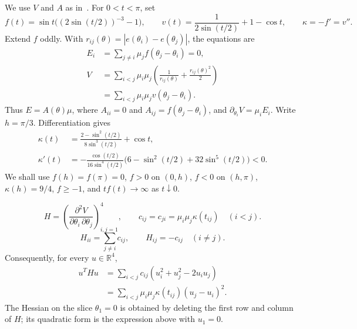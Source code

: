 \documentclass[11pt,a4paper]{article}
\numberwithin{equation}{section}
\theoremstyle{remark}
\newcommand{\R}{\mathbb R}
\begin{document}
We use $V$ and $A$ as in~\cite[Section~2]{CCLM}. For $0<t<\pi$, set
\begin{equation}\label{eq:kernel}
 f(t)=\sin t\bigl((2\sin(t/2))^{-3}-1\bigr),\qquad
 v(t)=\frac1{2\sin(t/2)}+1-\cos t,\qquad \kappa=-f'=v''.
\end{equation}
Extend $f$ oddly. With $r_{ij}(\theta)=|e(\theta_i)-e(\theta_j)|$, the equations are
\begin{equation}\label{eq:co-equations}
 \begin{aligned}
 E_i&=\sum_{j\ne i}\mu_jf(\theta_j-\theta_i)=0,\\
 V&=\sum_{i<j}\mu_i\mu_j
 \left(\frac1{r_{ij}(\theta)}+\frac{r_{ij}(\theta)^2}{2}\right)\\
 &=\sum_{i<j}\mu_i\mu_jv(\theta_j-\theta_i).
 \end{aligned}
\end{equation}
Thus $E=A(\theta)\mu$, where $A_{ii}=0$ and
$A_{ij}=f(\theta_j-\theta_i)$, and $\partial_{\theta_i}V=\mu_iE_i$.
Write $h=\pi/3$. Differentiation gives
\begin{equation}\label{eq:kappa}
 \begin{split}
 \kappa(t)&=\frac{2-\sin^2(t/2)}{8\sin^3(t/2)}+\cos t,\\
 \kappa'(t)&=-\frac{\cos(t/2)}{16\sin^4(t/2)}
 \bigl(6-\sin^2(t/2)+32\sin^5(t/2)\bigr)<0.
 \end{split}
\end{equation}
We shall use $f(h)=f(\pi)=0$, $f>0$ on $(0,h)$, $f<0$ on $(h,\pi)$,
$\kappa(h)=9/4$, $f\ge-1$, and $tf(t)\to\infty$ as $t\downarrow0$.

\[
 H=\left(\frac{\partial^2V}{\partial\theta_i\,\partial\theta_j}\right)_{i,j=1}^4,
 \qquad c_{ij}=c_{ji}=\mu_i\mu_j\kappa(t_{ij})\quad(i<j).
\]
\[
 H_{ii}=\sum_{j\ne i}c_{ij},\qquad H_{ij}=-c_{ij}\quad(i\ne j).
\]
Consequently, for every $u\in\R^4$,
\[
 \begin{aligned}
 u^THu
 &=\sum_{i<j}c_{ij}(u_i^2+u_j^2-2u_iu_j)\\
 &=\sum_{i<j}\mu_i\mu_j\kappa(t_{ij})(u_j-u_i)^2.
 \end{aligned}
\]
The Hessian on the slice $\theta_1=0$ is obtained by deleting the first
row and column of $H$; its quadratic form is the expression above with
$u_1=0$.
\end{document}
